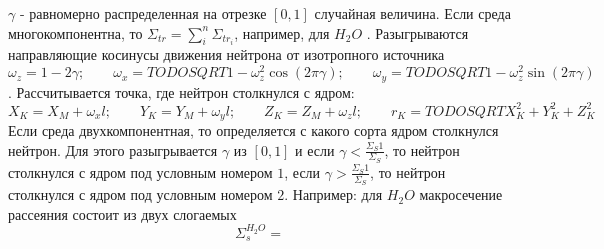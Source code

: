 \documentclass[a4paper]{article}
\begin{document}
    $\gamma$ - равномерно распределенная на отрезке $[0,1]$
    случайная величина. Если среда многокомпонентна, то
    \(\Sigma_{tr}=\sum_i^n \Sigma_{tr_i}\), например, для $H_2 O$
    . Разыгрываются направляющие косинусы движения нейтрона от
    изотропного источника
    \begin{equation}\nonumber
        \omega_z = 1 - 2\gamma;\qquad
        \omega_x = TODOSQRT{1 - \omega_z^2}\cos{(2\pi\gamma)};\qquad
        \omega_y = TODOSQRT{1 - \omega_z^2}\sin{(2\pi\gamma)}
    \end{equation}
    . Рассчитывается точка, где нейтрон столкнулся с ядром:
    \begin{equation}\nonumber
        X_K = X_M + \omega_x l;\qquad
        Y_K = Y_M + \omega_y l;\qquad
        Z_K = Z_M + \omega_z l;\qquad
        r_K = TODOSQRT{X_K^2 + Y_K^2 + Z_K^2}
    \end{equation}
    Если среда двухкомпонентная, то определяется с какого сорта ядром
    столкнулся нейтрон. Для этого разыгрывается $\gamma$ из $[0,1]$ и
    если $\gamma < \frac{\Sigma_S1}{\Sigma_S}$, то нейтрон столкнулся
    с ядром под условным номером $1$, если
    $\gamma > \frac{\Sigma_S1}{\Sigma_S}$, то нейтрон столкнулся с
    ядром под условным номером $2$. Например: для $H_2 O$
    макросечение рассеяния состоит из двух слогаемых
    \begin{equation}\nonumber
        \Sigma_s^{H_2 O} = 
    \end{equation}
\end{document}
